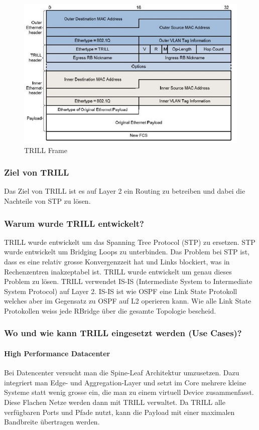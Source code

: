 \begin{figure}[h]
\centering
\includegraphics[width=0.6\linewidth]{images/trill_header}
\caption{TRILL Frame}
\label{fig:trillheader}
\end{figure}

\subsubsection{Ziel von TRILL} %
Das Ziel von TRILL ist es auf Layer 2 ein Routing zu betreiben und dabei die Nachteile von STP zu lösen.

\subsubsection{Warum wurde TRILL entwickelt?} %
TRILL wurde entwickelt um das Spanning Tree Protocol (STP) zu ersetzen. STP wurde entwickelt um Bridging Loops zu unterbinden. Das Problem bei STP ist, dass es eine relativ grosse Konvergenzzeit hat und Links blockiert, was in Rechenzentren inakzeptabel ist. TRILL wurde entwickelt um genau dieses Problem zu lösen. TRILL verwendet IS-IS (Intermediate System to Intermediate System Protocol) auf Layer 2. IS-IS ist wie OSPF eine Link State Protokoll welches aber im Gegensatz zu OSPF auf L2 operieren kann. Wie alle Link State Protokollen weiss jede RBridge über die gesamte Topologie bescheid. 

\subsubsection{Wo und wie kann TRILL eingesetzt werden (Use Cases)?} %


\paragraph{High Performance Datacenter}
Bei Datencenter versucht man die Spine-Leaf Architektur umzusetzen. Dazu integriert man Edge- und Aggregation-Layer und setzt im Core mehrere kleine Systeme statt wenig grosse ein, die man zu einem virtuell Device zusammenfasst. Diese Flachen Netze werden dann mit TRILL verwaltet. Da TRILL alle verfügbaren Ports und Pfade nutzt, kann die Payload mit einer maximalen Bandbreite übertragen werden. 


